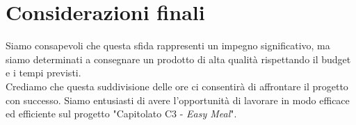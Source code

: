\section{Considerazioni finali}

Siamo consapevoli che questa sfida rappresenti un impegno significativo, 
ma siamo determinati a consegnare un prodotto di alta qualità rispettando 
il budget e i tempi previsti. \\
Crediamo che questa suddivisione delle ore ci consentirà di affrontare il 
progetto con successo. 
Siamo entusiasti di avere l'opportunità di lavorare in modo efficace ed 
efficiente sul progetto "Capitolato C3 - \textit{Easy Meal}".
